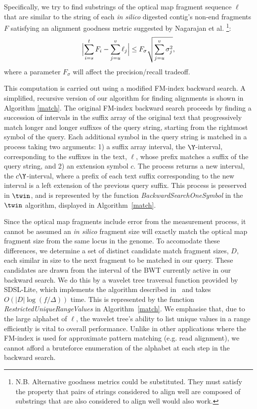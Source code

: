 \documentclass[doctor]{thesis}
\begin{document}
Specifically, we try to find substrings of the optical map fragment sequence $\ell$ that are similar to the string of each {\em in silico} digested contig's non-end fragments $F$ satisfying an alignment goodness metric suggested by Nagarajan et al. \cite{Nagarajan08} \footnote{N.B. Alternative goodness metrics could be substituted.  They must satisfy the property that pairs of strings considered to align well are composed of substrings that are also considered to align well would also work.}:
\begin{displaymath}
\Bigl \lvert \sum_{i=s}^{t}F_i - \sum_{j=u}^{v}\ell_j \Bigr \rvert \le F_\sigma \sqrt{\sum_{j=u}^{v}\sigma_{j}^{2}},
\end{displaymath}
where a parameter $F_\sigma$  will affect the precision/recall tradeoff.


This computation is carried out using a modified FM-index backward search.  
A simplified, recursive version of our algorithm for finding alignments is shown in Algorithm \ref{match}.
The original FM-index backward search proceeds by finding a succession of intervals in the suffix array of the original text that progressively match longer and longer suffixes of the query string, starting from the rightmost symbol of the query.   Each additional symbol in the query string is matched in a process taking two arguments: 1) a suffix array interval, the $\Y$-interval, corresponding to the suffixes in the text, $\ell$, whose prefix matches a suffix of the query string, and 2) an extension symbol $c$.  The process returns a new interval, the $c\Y$-interval, where a prefix of each text suffix corresponding to the new interval is a left extension of the previous query suffix. This process is preserved in $\twin$, and is represented by the function \emph{BackwardSearchOneSymbol} in the $\twin$ algorithm, displayed in Algorithm~\ref{match}.


Since the optical map fragments include error from the measurement process, 
it cannot be assumed an {\em in silico} fragment size will exactly match the optical map fragment size from the same locus in the genome.
To accomodate these differences, we determine a set of distinct candidate match fragment sizes, $D$, each similar in size to the next fragment to be matched in our query. These candidates are drawn from the 
 interval of the BWT currently active in our backward search.
We do this by a wavelet tree traversal function provided by SDSL-Lite, which implements the algorithm described in~\cite{GNPtcs11} and takes $O(|D|\log(f/\Delta))$ time. This is represented by the function \emph{RestrictedUniqueRangeValues} in Algorithm~\ref{match}. We emphasise that, due to the large alphabet of $\ell $, the wavelet tree's ability to list unique values in a range efficiently is vital to overall performance. Unlike in other applications where the FM-index is used for approximate pattern matching (e.g. read alignment), we cannot afford a bruteforce enumeration of the alphabet at each step in the backward search.
\end{document}
